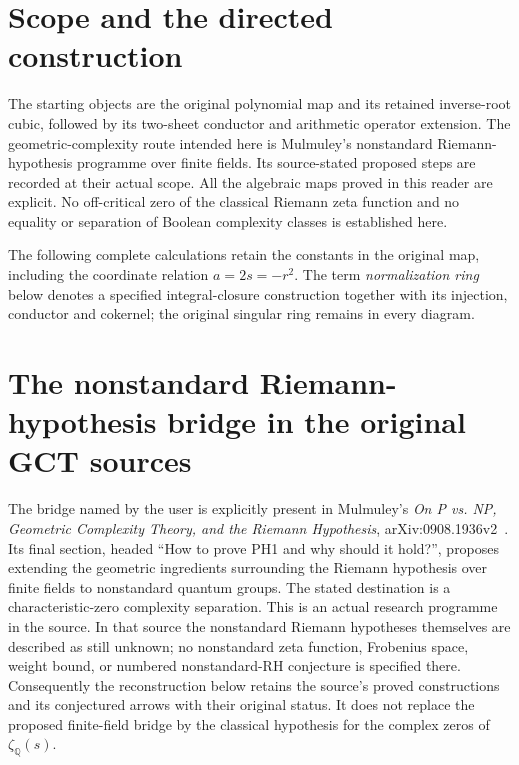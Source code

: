 \providecommand{\GL}{\operatorname{GL}}
\providecommand{\End}{\operatorname{End}}
\section{Scope and the directed construction}
The starting objects are the original polynomial map and its retained
inverse-root cubic, followed by its two-sheet conductor and arithmetic
operator extension. The geometric-complexity route intended here is
Mulmuley's nonstandard Riemann-hypothesis programme over finite fields.
Its source-stated proposed steps are recorded at their actual scope.
All the algebraic maps proved in this reader are explicit. No off-critical
zero of the classical Riemann zeta function and no equality or separation
of Boolean complexity classes is established here.

The following complete calculations retain the constants in the original
map, including the coordinate relation $a=2s=-r^2$. The term
\emph{normalization ring} below denotes a specified integral-closure
construction together with its injection, conductor and cokernel;
the original singular ring remains in every diagram.

\section{The nonstandard Riemann-hypothesis bridge in the original GCT sources}
\label{sec:gct-nrh-source-bridge}

The bridge named by the user is explicitly present in Mulmuley's
\emph{On P vs. NP, Geometric Complexity Theory, and the Riemann Hypothesis},
arXiv:0908.1936v2~\cite{mulmuley2009gctrh}.  Its final section, headed ``How to prove PH1 and why
should it hold?'', proposes extending the geometric ingredients surrounding
the Riemann hypothesis over finite fields to nonstandard quantum groups.
The stated destination is a characteristic-zero complexity separation.
This is an actual research programme in the source.  In that source the
nonstandard Riemann hypotheses themselves are described as still unknown;
no nonstandard zeta function, Frobenius space, weight bound, or numbered
nonstandard-RH conjecture is specified there.  Consequently the reconstruction
below retains the source's proved constructions and its conjectured arrows
with their original status.  It does not replace the proposed finite-field
bridge by the classical hypothesis for the complex zeros of
$\zeta_{\mathbb Q}(s)$.

